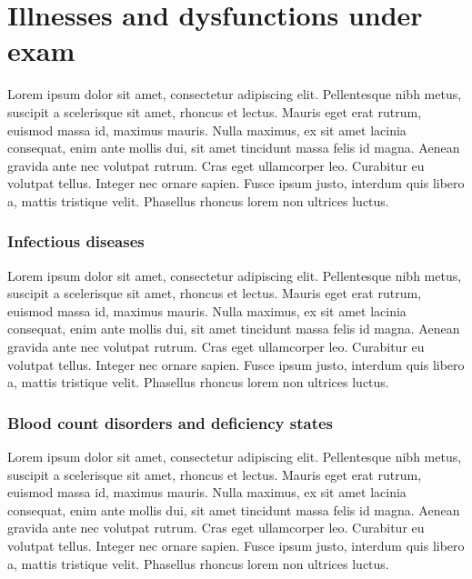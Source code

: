 \section{Illnesses and dysfunctions under exam}\label{sec:illnessesanddysfunctions}
Lorem ipsum dolor sit amet, consectetur adipiscing elit. Pellentesque nibh metus, suscipit a scelerisque sit amet, rhoncus et lectus. Mauris eget erat rutrum, euismod massa id, maximus mauris. Nulla maximus, ex sit amet lacinia consequat, enim ante mollis dui, sit amet tincidunt massa felis id magna. Aenean gravida ante nec volutpat rutrum. Cras eget ullamcorper leo. Curabitur eu volutpat tellus. Integer nec ornare sapien. Fusce ipsum justo, interdum quis libero a, mattis tristique velit. Phasellus rhoncus lorem non ultrices luctus.


\subsubsection{Infectious diseases}\label{sub:infectiousdiseases}
Lorem ipsum dolor sit amet, consectetur adipiscing elit. Pellentesque nibh metus, suscipit a scelerisque sit amet, rhoncus et lectus. Mauris eget erat rutrum, euismod massa id, maximus mauris. Nulla maximus, ex sit amet lacinia consequat, enim ante mollis dui, sit amet tincidunt massa felis id magna. Aenean gravida ante nec volutpat rutrum. Cras eget ullamcorper leo. Curabitur eu volutpat tellus. Integer nec ornare sapien. Fusce ipsum justo, interdum quis libero a, mattis tristique velit. Phasellus rhoncus lorem non ultrices luctus.

\subsubsection{Blood count disorders and deficiency states}\label{sub:bloodcountdisorders}
Lorem ipsum dolor sit amet, consectetur adipiscing elit. Pellentesque nibh metus, suscipit a scelerisque sit amet, rhoncus et lectus. Mauris eget erat rutrum, euismod massa id, maximus mauris. Nulla maximus, ex sit amet lacinia consequat, enim ante mollis dui, sit amet tincidunt massa felis id magna. Aenean gravida ante nec volutpat rutrum. Cras eget ullamcorper leo. Curabitur eu volutpat tellus. Integer nec ornare sapien. Fusce ipsum justo, interdum quis libero a, mattis tristique velit. Phasellus rhoncus lorem non ultrices luctus.


